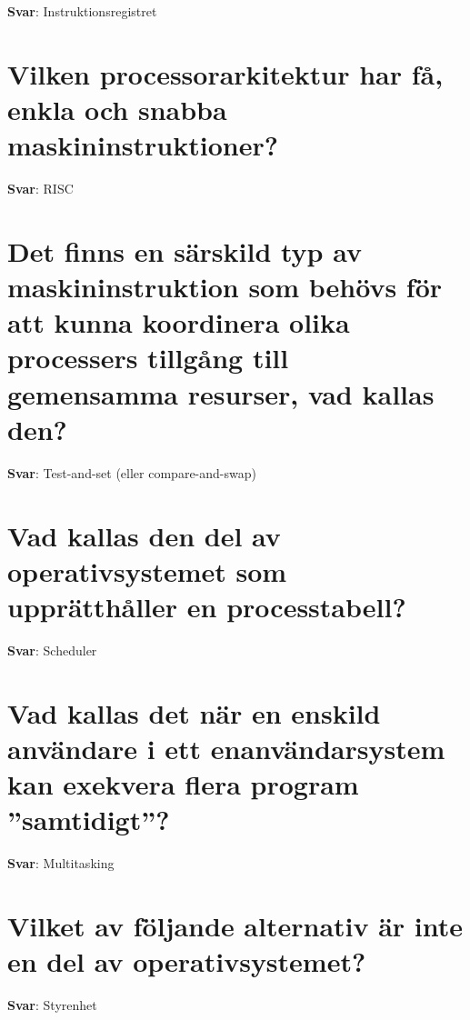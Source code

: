 \documentclass[a4paper,11pt,oneside]{book}
\begin{document}
\begin{sloppypar}
\label{q:5:sa:sv:True}

\textbf{Svar}: Instruktionsregistret



\section{Vilken processorarkitektur har f\r{a}, enkla och snabba maskininstruktioner?}

\label{q:6:sa:sv:True}

\textbf{Svar}: RISC



\section{Det finns en s\"arskild typ av maskininstruktion som beh\"ovs f\"or att kunna koordinera olika processers tillg\r{a}ng till gemensamma resurser, vad kallas den?}

\label{q:7:sa:sv:True}

\textbf{Svar}: Test-and-set (eller compare-and-swap)



\section{Vad kallas den del av operativsystemet som uppr\"atth\r{a}ller en processtabell?}

\label{q:8:sa:sv:True}

\textbf{Svar}: Scheduler



\section{Vad kallas det n\"ar en enskild anv\"andare i ett enanv\"andarsystem kan exekvera flera program {\textquotedblright}samtidigt{\textquotedblright}?}

\label{q:10:sa:sv:True}

\textbf{Svar}: Multitasking



\section{Vilket av f\"oljande alternativ \"ar inte en del av operativsystemet?}

\label{q:11:sa:sv:True}

\textbf{Svar}: Styrenhet




\end{sloppypar}
\end{document}
